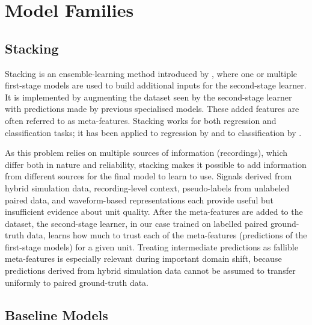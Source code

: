 \section{Model Families}

\subsection{Stacking}

Stacking is an ensemble-learning method introduced by \textcite{WOLPERT1992241}, where one or multiple first-stage models are used to build additional inputs for the second-stage learner. It is implemented by augmenting the dataset seen by the second-stage learner with predictions made by previous specialised models. These added features are often referred to as meta-features. Stacking works for both regression and classification tasks; it has been applied to regression by \textcite{Breiman1996-xk} and to classification by \textcite{Leblanc01121996}.

As this problem relies on multiple sources of information (recordings), which differ both in nature and reliability, stacking makes it possible to add information from different sources for the final model to learn to use. Signals derived from hybrid simulation data, recording-level context, pseudo-labels from unlabeled paired data, and waveform-based representations each provide useful but insufficient evidence about unit quality. After the meta-features are added to the dataset, the second-stage learner, in our case trained on labelled paired ground-truth data, learns how much to trust each of the meta-features (predictions of the first-stage models) for a given unit. Treating intermediate predictions as fallible meta-features is especially relevant during important domain shift, because predictions derived from hybrid simulation data cannot be assumed to transfer uniformly to paired ground-truth data.

\subsection{Baseline Models}

